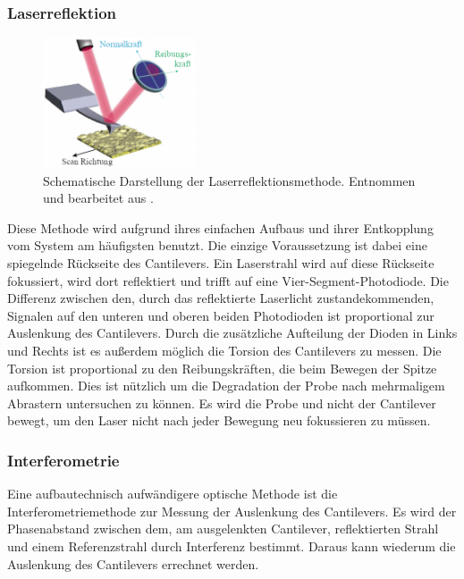     \subsubsection*{Laserreflektion}
        \begin{figure}
            \vspace{-0.6cm}
            \centering{}
            \includegraphics[width=0.4\textwidth]{bilder/Viersegmentphotodiode.png}
            \caption{Schematische Darstellung der Laserreflektionsmethode. Entnommen und bearbeitet aus \cite{voigtlaender}.} \vspace*{-0.3cm}
            \label{fig:Viersegmentphotodiode}
        \end{figure}
        \FloatBarrier
        Diese Methode wird aufgrund ihres einfachen Aufbaus und ihrer Entkopplung vom System am häufigsten benutzt.
        Die einzige Voraussetzung ist dabei eine spiegelnde Rückseite des Cantilevers.
        Ein Laserstrahl wird auf diese Rückseite fokussiert, wird dort reflektiert und trifft auf eine Vier-Segment-Photodiode.
        Die Differenz zwischen den, durch das reflektierte Laserlicht zustandekommenden, Signalen auf den unteren und oberen beiden Photodioden ist proportional zur Auslenkung des Cantilevers.
        Durch die zusätzliche Aufteilung der Dioden in Links und Rechts ist es außerdem möglich die Torsion des Cantilevers zu messen.
        Die Torsion ist proportional zu den Reibungskräften, die beim Bewegen der Spitze aufkommen.
        Dies ist nützlich um die Degradation der Probe nach mehrmaligem Abrastern untersuchen zu können.
        Es wird die Probe und nicht der Cantilever bewegt, um den Laser nicht nach jeder Bewegung neu fokussieren zu müssen.

    \subsubsection*{Interferometrie}
        Eine aufbautechnisch aufwändigere optische Methode ist die Interferometriemethode zur Messung der Auslenkung des Cantilevers.
        Es wird der Phasenabstand zwischen dem, am ausgelenkten Cantilever, reflektierten Strahl und einem Referenzstrahl durch Interferenz bestimmt.
        Daraus kann wiederum die Auslenkung des Cantilevers errechnet werden.

